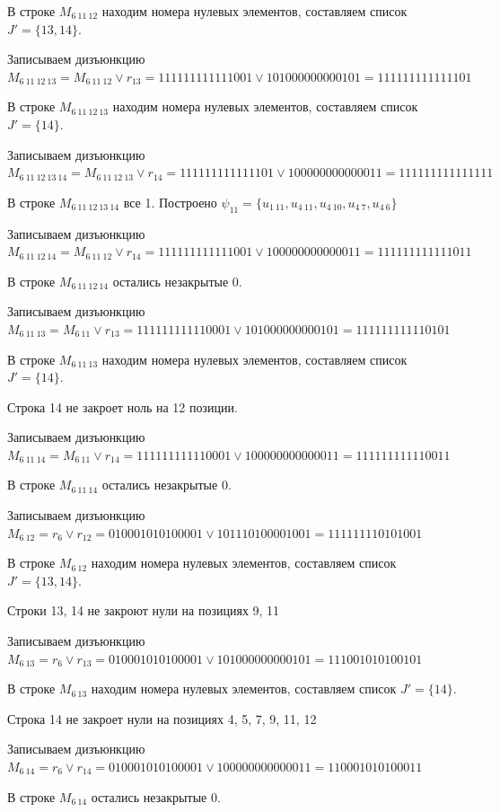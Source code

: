 \documentclass{article}
\begin{document}
В строке $M_{6\ 11\ 12}$ находим номера нулевых элементов, составляем список $J' = \{13, 14\}$.

Записываем дизъюнкцию $M_{6\ 11\ 12\ 13} = M_{6\ 11\ 12}\lor r_{13} = 111111111111001 \lor 101000000000101 = 111111111111101$

В строке $M_{6\ 11\ 12\ 13}$ находим номера нулевых элементов, составляем список $J' = \{14\}$.

Записываем дизъюнкцию $M_{6\ 11\ 12\ 13\ 14} = M_{6\ 11\ 12\ 13}\lor r_{14} = 111111111111101 \lor 100000000000011 = 111111111111111$

В строке $M_{6\ 11\ 12\ 13\ 14}$ все 1. Построено $\psi_{11} = \{u_{1\ 11},u_{4\ 11},u_{4\ 10},u_{4\ 7},u_{4\ 6}\}$

Записываем дизъюнкцию $M_{6\ 11\ 12\ 14} = M_{6\ 11\ 12}\lor r_{14} = 111111111111001 \lor 100000000000011 = 111111111111011$

В строке $M_{6\ 11\ 12\ 14}$ остались незакрытые 0.

Записываем дизъюнкцию $M_{6\ 11\ 13} = M_{6\ 11}\lor r_{13} = 111111111110001 \lor 101000000000101 = 111111111110101$

В строке $M_{6\ 11\ 13}$ находим номера нулевых элементов, составляем список $J' = \{14\}$.

Строка 14 не закроет ноль на 12 позиции.

Записываем дизъюнкцию $M_{6\ 11\ 14} = M_{6\ 11}\lor r_{14} = 111111111110001 \lor 100000000000011 = 111111111110011$

В строке $M_{6\ 11\ 14}$ остались незакрытые 0.

Записываем дизъюнкцию $M_{6\ 12} = r_{6}\lor r_{12} = 010001010100001 \lor 101110100001001 = 111111110101001$

В строке $M_{6\ 12}$ находим номера нулевых элементов, составляем список $J' = \{13, 14\}$.

Строки 13, 14 не закроют нули на позициях 9, 11

Записываем дизъюнкцию $M_{6\ 13} = r_{6}\lor r_{13} = 010001010100001 \lor 101000000000101 = 111001010100101$

В строке $M_{6\ 13}$ находим номера нулевых элементов, составляем список $J' = \{14\}$.

Строка 14 не закроет нули на позициях 4, 5, 7, 9, 11, 12

Записываем дизъюнкцию $M_{6\ 14} = r_{6}\lor r_{14} = 010001010100001 \lor 100000000000011 = 110001010100011$

В строке $M_{6\ 14}$ остались незакрытые 0.
\end{document}
